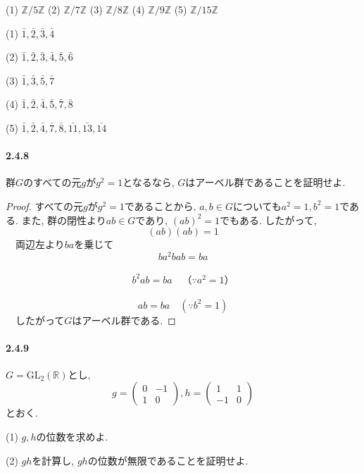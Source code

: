 (1) $\mathbb{Z}/5\mathbb{Z}$ \quad (2) $\mathbb{Z}/7\mathbb{Z}$ \quad 
(3) $\mathbb{Z}/8\mathbb{Z}$ \quad
(4) $\mathbb{Z}/9\mathbb{Z}$ \quad (5) $\mathbb{Z}/15\mathbb{Z}$　\newline

(1) $ \bar{1},\bar{2}, \bar{3}, \bar{4}$

(2) $ \bar{1}, \bar{2}, \bar{3}, \bar{4}, \bar{5}, \bar{6}$

(3) $ \bar{1}, \bar{3}, \bar{5}, \bar{7} $

(4) $ \bar{1}, \bar{2}, \bar{4}, \bar{5}, \bar{7}, \bar{8} $

(5) $\bar{1}, \bar{2}, \bar{4}, \bar{7}, \bar{8}, \bar{11}, \bar{13}, \bar{14} $\newline


\paragraph{2.4.8}  群$G$のすべての元$g$が$g^2=1$となるなら, 
$G$はアーベル群であることを証明せよ.
\begin{proof}
  すべての元$g$が$g^2=1$であることから, $a,b \in G$についても$a^2=1,b^2=1$である.
  また, 群の閉性より$ab \in G$であり, $(ab)^2=1$でもある. したがって,
　\[(ab)(ab)=1\]
　両辺左より$ba$を乗じて
　\[ba^2bab=ba\]
　\[b^2ab=ba \quad（\because a^2=1）\]
　\[ab=ba \quad (\because b^2=1)\]
　したがって$G$はアーベル群である.
\end{proof}\leavevmode

\paragraph{2.4.9}  $G=\mathrm{GL}_2(\mathbb{R})$とし,
\[g=\begin{pmatrix}0&-1\\1&0 \end{pmatrix}, h=\begin{pmatrix}1&1\\-1&0\end{pmatrix}\] 
とおく.

(1) $g,h$の位数を求めよ.

(2) $gh$を計算し, $gh$の位数が無限であることを証明せよ.\newline

